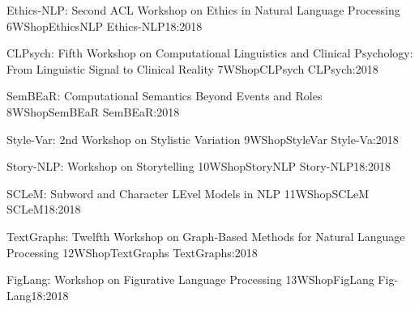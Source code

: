 \begin{wsschedule}
   {Ethics-NLP: Second ACL Workshop on Ethics in Natural Language Processing}
   {6}{WShopEthicsNLP}
   {Ethics-NLP18:2018}
   {\WShopLocEthicsNLP}
   
 \end{wsschedule}


\begin{wsschedule}
  {CLPsych: Fifth Workshop on Computational Linguistics and Clinical Psychology: From Linguistic Signal to Clinical Reality}
  {7}{WShopCLPsych}
  {CLPsych:2018}
  {\WShopLocCLPsych}
  
\end{wsschedule}

\begin{wsschedule}
  {SemBEaR: Computational Semantics Beyond Events and Roles}
  {8}{WShopSemBEaR}
  {SemBEaR:2018}
  {\WShopLocSemBEaR}
  
\end{wsschedule}

\begin{wsschedule}
  {Style-Var: 2nd Workshop on Stylistic Variation}
  {9}{WShopStyleVar}
  {Style-Va:2018}
  {\WShopLocStyleVar}
  
\end{wsschedule}

\begin{wsschedule}
  {Story-NLP: Workshop on Storytelling}
  {10}{WShopStoryNLP}
  {Story-NLP18:2018}
  {\WShopLocStoryNLP}
  
\end{wsschedule}


\clearpage
{}

\begin{wsschedule}
  {SCLeM: Subword and Character LEvel Models in NLP}
  {11}{WShopSCLeM}
  {SCLeM18:2018}
  {\WShopLocSCLeM}
  
\end{wsschedule}

  \begin{wsschedule}
   {TextGraphs: Twelfth Workshop on Graph-Based Methods for Natural Language Processing}
   {12}{WShopTextGraphs}
   {TextGraphs:2018}
   {\WShopLocTextGraphs}
   
 \end{wsschedule}
 
  \begin{wsschedule}
   {FigLang: Workshop on Figurative Language Processing}
   {13}{WShopFigLang}
   {Fig-Lang18:2018}
   {\WShopLocFigLang}
   
 \end{wsschedule}


